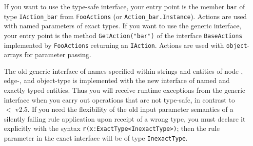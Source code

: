 \begin{note}
If you want to use the type-safe interface, your entry point is the member \texttt{bar} of type \texttt{IAction\_bar} from \texttt{FooActions} (or \texttt{Action\_bar.Instance}).
Actions are used with named parameters of exact types.
If you want to use the generic interface, your entry point is the method \texttt{GetAction("bar")} of the interface \texttt{BaseActions} implemented by \texttt{FooActions} returning an \texttt{IAction}.
Actions are used with \texttt{object}-arrays for parameter passing.
\end{note}

\begin{note}
The old generic interface of names specified within strings and entities of node-, edge-, and object-type is implemented with the new interface of named and exactly typed entities.
Thus you will receive runtime exceptions from the generic interface when you carry out operations that are not type-safe, in contrast to \GrG\ $<$ v2.5.
If you need the flexibility of the old input parameter semantics of a silently failing rule application upon receipt of a wrong type,
you must declare it explicitly with the syntax \verb#r(x:ExactType<InexactType>)#;
then the rule parameter in the exact interface will be of type \texttt{InexactType}.
\end{note}


